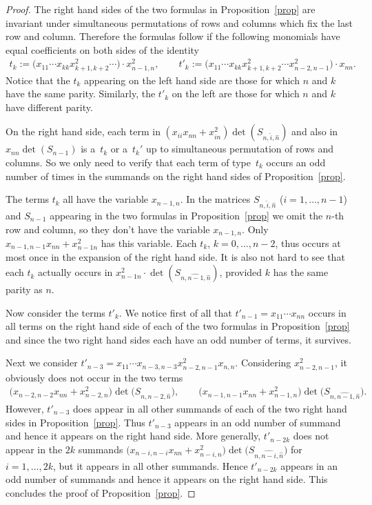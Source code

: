 \documentclass[10pt,a4paper]{amsart}
\numberwithin{equation}{section}
\begin{document}
\begin{proof} The right hand sides of the two formulas in Proposition~\ref{prop} are invariant under simultaneous permutations of rows and columns which fix the last row and column. Therefore the formulas follow if the following monomials have equal coefficients on both sides of the identity
\begin{gather*}
t_k:=\big(x_{11}\cdots x_{kk}x_{k+1,k+2}^2\cdots\big)\cdot x_{n-1,n}^2,\qquad
t'_k:=\big(x_{11}\cdots x_{kk}x_{k+1,k+2}^2\cdots x_{n-2,n-1}^2\big)\cdot x_{nn}.
\end{gather*}
Notice that the $t_k$ appearing on the left hand side are those for which $n$ and $k$ have the same parity. Similarly, the $t'_k$ on the left are those for which $n$ and $k$ have different parity.

On the right hand side, each term in $(x_{ii}x_{nn}+x_{in}^2)\det(S_{n,\widehat{i},\hat{n}})$ and also in $x_{nn}\det(S_{n-1})$ is a~$t_k$ or a~$t_k'$ up to simultaneous permutation of rows and columns. So we only need to verify that each term of type~$t_k$ occurs an odd number of times in the summands on the right hand sides of Proposition~\ref{prop}.

The terms $t_k$ all have the variable $x_{n-1,n}$. In the matrices $S_{n,\hat{i},\hat{n}}$ ($i=1,\ldots,n-1$) and $S_{n-1}$ appearing in the two formulas in Proposition~\ref{prop} we omit the $n$-th row and column, so they don't have the variable $x_{n-1,n}$. Only $x_{n-1,n-1}x_{nn}+x_{n-1 n}^2$ has this variable. Each $t_k$, $k=0,\ldots, n-2$, thus occurs at most once in the expansion of the right hand side. It is also not hard to see that each $t_k$ actually occurs in $x_{n-1 n}^2\cdot \det(S_{n,\widehat{n-1},\hat{n}})$, provided $k$ has the same parity as $n$.

Now consider the terms $t'_k$. We notice first of all that $t'_{n-1}=x_{11}\cdots x_{nn}$ occurs in all terms on the right hand side of each of the two formulas in Proposition~\ref{prop} and since the two right hand sides each have an odd number of terms, it survives.

Next we consider $t'_{n-3}=x_{11}\cdots x_{n-3,n-3} x_{n-2,n-1}^2 x_{n,n}$. Considering $x_{n-2,n-1}^2$, it obviously does not occur in the two terms
\begin{gather*}
\big(x_{n-2,n-2}x_{nn}+x_{n-2,n}^2\big)\det\big(S_{n,\widehat{n-2},\hat{n}}\big),\qquad
\big(x_{n-1,n-1}x_{nn}+x_{n-1,n}^2\big)\det\big(S_{n,\widehat{n-1},\hat{n}}\big).
\end{gather*}
However, $t'_{n-3}$ does appear in all other summands of each of the two right hand sides in Proposition~\ref{prop}. Thus $t'_{n-3}$ appears in an odd number of summand and hence it appears on the right hand side. More generally, $t'_{n-2k}$ does not appear in the $2k$ summands $\big(x_{n-i,n-i}x_{nn}+ x_{n-i,n}^2\big)\det\big(S_{n,\widehat{n-i},\hat{n}}\big)$ for $i=1,\ldots,2k$, but it appears in all other summands. Hence $t'_{n-2k}$ appears in an odd number of summands and hence it appears on the right hand side. This concludes the proof of Proposition~\ref{prop}.
\end{proof}
\end{document}
